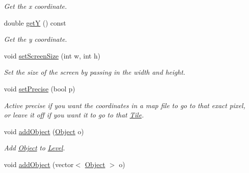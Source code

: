 \begin{DoxyCompactItemize}
\begin{DoxyCompactList}\small\item\em Get the x coordinate. \end{DoxyCompactList}\item 
double \hyperlink{classLevel_acb5b4e5e0bf364142fa0facc7badea4a}{getY} () const \hypertarget{classLevel_acb5b4e5e0bf364142fa0facc7badea4a}{}\label{classLevel_acb5b4e5e0bf364142fa0facc7badea4a}

\begin{DoxyCompactList}\small\item\em Get the y coordinate. \end{DoxyCompactList}\item 
void \hyperlink{classLevel_a22a202624bb540acc74b678b74b60c9d}{set\+Screen\+Size} (int w, int h)\hypertarget{classLevel_a22a202624bb540acc74b678b74b60c9d}{}\label{classLevel_a22a202624bb540acc74b678b74b60c9d}

\begin{DoxyCompactList}\small\item\em Set the size of the screen by passing in the width and height. \end{DoxyCompactList}\item 
void \hyperlink{classLevel_a6f522671fde4a9d25945a9df651f6e28}{set\+Precise} (bool p)\hypertarget{classLevel_a6f522671fde4a9d25945a9df651f6e28}{}\label{classLevel_a6f522671fde4a9d25945a9df651f6e28}

\begin{DoxyCompactList}\small\item\em Active precise if you want the coordinates in a map file to go to that exact pixel, or leave it off if you want it to go to that \hyperlink{classTile}{Tile}. \end{DoxyCompactList}\item 
void \hyperlink{classLevel_a85e4149562c645b6ee11e7a0338dc6d6}{add\+Object} (\hyperlink{classObject}{Object} o)\hypertarget{classLevel_a85e4149562c645b6ee11e7a0338dc6d6}{}\label{classLevel_a85e4149562c645b6ee11e7a0338dc6d6}

\begin{DoxyCompactList}\small\item\em Add \hyperlink{classObject}{Object} to \hyperlink{classLevel}{Level}. \end{DoxyCompactList}\item 
void \hyperlink{classLevel_a227e7b01aecb4cfd14cd54233788dee2}{add\+Object} (vector$<$ \hyperlink{classObject}{Object} $>$ o)\hypertarget{classLevel_a227e7b01aecb4cfd14cd54233788dee2}{}\label{classLevel_a227e7b01aecb4cfd14cd54233788dee2}


\end{DoxyCompactItemize}
